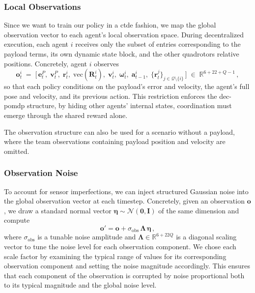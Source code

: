 \subsubsection{Local Observations}
Since we want to train our policy in a \gls{ctde} fashion, we map the global observation vector to each agent's local observation space. During decentralized execution, each agent \(i\) receives only the subset of entries corresponding to the payload terms, its own dynamic state block, and the other quadrotors relative positions.  Concretely, agent \(i\) observes
\begin{equation}
\mathbf{o}^i_t 
\;=\;
\bigl[\,
\mathbf{e}^P_t,\;\mathbf{v}^P_t,\;\mathbf{r}^i_t,\;\mathrm{vec}(\mathbf{R}^i_t),\;\mathbf{v}^i_t,\;\boldsymbol{\omega}^i_t,\;\mathbf{a}^i_{t-1},\;
\{\mathbf{r}^j_t\}_{j \in \mathcal{Q}\setminus\{i\}}
\,\bigr]\;\in\;\mathbb{R}^{6 + 22 + Q - 1}\,,
\end{equation}
so that each policy conditions on the payload's error and velocity, the agent's full pose and velocity, and its previous action. This restriction enforces the \gls{dec-pomdp} structure, by hiding other agents' internal states, coordination must emerge through the shared reward alone.

The observation structure can also be used for a scenario without a payload, where the team observations containing payload position and velocity are omitted.
\subsubsection{Observation Noise}
To account for sensor imperfections, we can inject structured Gaussian noise into the global observation vector at each timestep. Concretely, given an observation $\mathbf{o}$, we draw a standard normal vector $\bm{\eta}\sim\mathcal{N}(\mathbf{0},\mathbf{I})$ of the same dimension and compute
\begin{equation}
    \mathbf{o}' = \mathbf{o} + \sigma_{\mathrm{obs}}\,\bm{\Lambda}\,\bm{\eta}\,,
\end{equation}
where $\sigma_{\mathrm{obs}}$ is a tunable noise amplitude and $\bm{\Lambda}\in\mathbb{R}^{6+22Q}$ is a diagonal scaling vector to tune the noise level for each observation component. We chose each scale factor by examining the typical range of values for its corresponding observation component and setting the noise magnitude accordingly. This ensures that each component of the observation is corrupted by noise proportional both to its typical magnitude and the global noise level.
